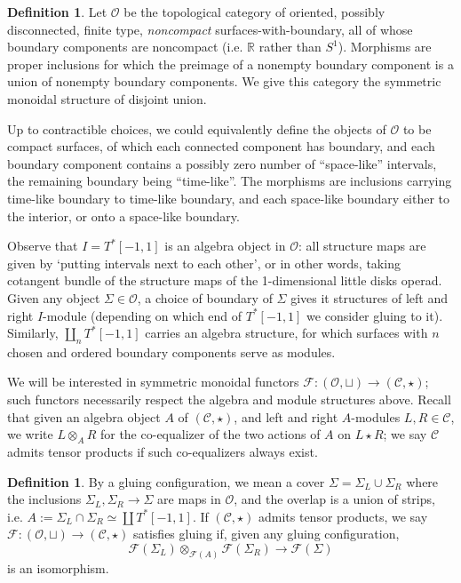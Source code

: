 \documentclass{article}
\def\R{\mathbb{R}}
\theoremstyle{definition}
\newtheorem{definition}
[theorem]{Definition}
\begin{document}
\begin{definition}
    Let $\mathscr{O}$ be the topological category of oriented, possibly disconnected, finite type,  {\em noncompact} surfaces-with-boundary, all of whose boundary components are noncompact (i.e.  $\R$ rather than $S^1$). Morphisms are proper inclusions for which the preimage of a nonempty boundary component is a union of nonempty boundary components.   We give this category the symmetric monoidal structure of disjoint union.
 
\end{definition}

Up to contractible choices, we could equivalently define the objects of $\mathscr{O}$ to be compact surfaces, of which each connected component has boundary, and each boundary component contains a possibly zero number of ``space-like'' intervals, the remaining boundary being ``time-like''.    The morphisms are  inclusions carrying time-like boundary to time-like boundary, and each space-like boundary either to the interior, or onto a space-like boundary. 


Observe that $I = T^*[-1,1]$ is an algebra object in $\mathscr{O}$:  all structure maps are given by `putting intervals next to each other', or in other words, taking cotangent bundle of the structure maps of the 1-dimensional little disks operad.  Given any object $\Sigma \in \mathscr{O}$, a choice of boundary of $\Sigma$ gives it structures of left and right $I$-module (depending on which end of $T^*[-1,1]$ we consider gluing to it). 
Similarly,  $\coprod_n T^*[-1,1]$ carries an algebra structure, for which surfaces with $n$ chosen and ordered boundary components serve as modules. 


We will be interested in symmetric monoidal functors 
$\mathcal{F}: (\mathscr{O}, \sqcup) \to (\mathcal{C}, \star)$; such functors necessarily respect the algebra and module structures above.   
Recall that given an algebra object $A$ of $(\mathcal{C}, \star)$, and left and right $A$-modules $L, R \in \mathcal{C}$, 
we write $L \otimes_A R$ for the co-equalizer of the two actions of $A$ on $L \star R$; we say $\mathcal{C}$ admits tensor products if such co-equalizers always exist. 

\begin{definition} \label{def: gluing}
    By a gluing configuration, we mean a cover $\Sigma = \Sigma_L \cup \Sigma_R$ where the inclusions $\Sigma_L, \Sigma_R \to \Sigma$ are maps in $\mathscr{O}$, and the overlap is a union of strips, i.e. $A:=\Sigma_L \cap \Sigma_R \simeq \coprod T^*[-1,1]$.      
    If $(\mathcal{C}, \star)$ admits tensor products, we say $\mathcal{F}: (\mathscr{O},\sqcup) \to (\mathcal{C}, \star)$ satisfies gluing if, given any gluing configuration,  
    \begin{equation} \label{gluing} \mathcal{F}(\Sigma_L) \otimes_{\mathcal{F}(A)} \mathcal{F}(\Sigma_R) \to \mathcal{F}(\Sigma)\end{equation}
is an isomorphism.
\end{definition}
\end{document}
